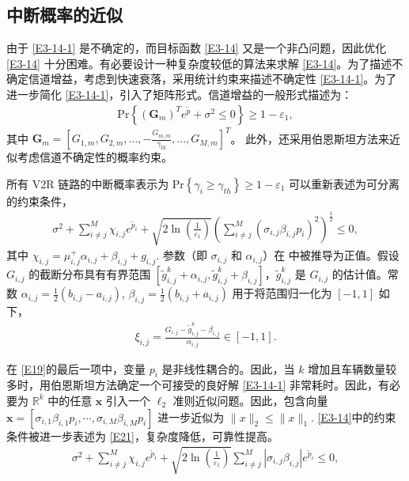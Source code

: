 \subsection{中断概率的近似}\label{section3-3-2}

由于 \eqref{E3-14-1} 是不确定的，而目标函数 \eqref{E3-14} 又是一个非凸问题，因此优化 \eqref{E3-14} 十分困难。有必要设计一种复杂度较低的算法来求解 \eqref{E3-14}。为了描述不确定信道增益，考虑到快速衰落，采用统计约束来描述不确定性 \eqref{E3-14-1}。为了进一步简化 \eqref{E3-14-1}，引入了矩阵形式。信道增益的一般形式描述为：
\begin{eqnarray}\label{E18}
\textrm{Pr}\left\{\left(\textbf{G}_m\right)^Te^{\widetilde{p}}+\sigma^2\le0\right\}\geq1-\varepsilon_1,
\end{eqnarray}
其中 $\textbf{G}_m=\left[G_{1,m},G_{2,m},\ldots,-\frac{G_{m,m}}{\gamma_{th}},\ldots,G_{M,m}\right]^T$。
此外，还采用伯恩斯坦方法来近似考虑信道不确定性的概率约束。

所有 V2R 链路的中断概率表示为 $\textrm{Pr}\left\{\gamma_i\geq\gamma_{th}\right\}\geq1-\varepsilon_1$
可以重新表述为可分离的约束条件，
\begin{eqnarray}\label{E19}
\!\!\!\sigma^2+\!\sum_{i\neq j}^{M}{\chi_{i,j}e^{{\widetilde{p}}_i}}+\sqrt{2\ln\left(\frac{1}{\varepsilon_1}\right)}\left(\sum_{i\neq j}^{M}\left(\sigma_{i,j}\beta_{i,j}p_i\right)^2\right)^\frac{1}{2}\!\!\!\!\!\le0,
\end{eqnarray}
其中 $\chi_{i,j}=\mu_{i,j}^+\alpha_{i,j}+\beta_{i,j}+g_{i,j}$. 参数（即 $\sigma_{i,j}$ 和 $\alpha_{i,j}$）在 \cite{CCO}中被推导为正值。假设 $G_{i,j}$ 的截断分布具有有界范围 $\left[{\widetilde{g}}_{i,j}^k+\alpha_{i,j},{\widetilde{g}}_{i,j}^k+\beta_{i,j}\right]$，${\widetilde{g}}_{i,j}^k$ 是 $G_{i,j}$ 的估计值。常数 $\alpha_{i,j}=\frac{1}{2}\left(b_{i,j}-a_{i,j}\right)$, $\beta_{i,j}=\frac{1}{2}\left(b_{i,j}+a_{i,j}\right)$ 用于将范围归一化为 $\left[-1,1\right]$ 如下，
\begin{eqnarray}\label{E20}
\xi_{i,j}=\frac{G_{i,j}-{\widetilde{g}}_{i,j}^k-\beta_{i,j}}{\alpha_{i,j}}\in\left[-1,1\right].
\end{eqnarray}

在 \eqref{E19}的最后一项中，变量 $p_i$ 是非线性耦合的。因此，当 $k$ 增加且车辆数量较多时，用伯恩斯坦方法确定一个可接受的良好解 \eqref{E3-14-1} 非常耗时。因此，有必要为 $\mathbb{R}^k$ 中的任意 $\mathbf{x}$ 引入一个 $\ell_2$ 准则近似问题。因此，包含向量 $\mathbf{x}=\left[\sigma_{i,1}\beta_{i,1}p_i,\cdots,\sigma_{i,M}\beta_{i,M}p_i\right]$ 进一步近似为 $\parallel x\parallel_2 \le \parallel x\parallel_1$. \eqref{E3-14}中的约束条件被进一步表述为 \eqref{E21}，复杂度降低，可靠性提高。
\begin{eqnarray}\label{E21}
\sigma^2+\sum_{i\neq j}^{M}{\chi_{i,j}e^{{\widetilde{p}}_i}}+\sqrt{2\ln\left(\frac{1}{\varepsilon_1}\right)}\sum_{i\neq j}^{M}{\left|\sigma_{i,j}\beta_{i,j}\right|e^{{\widetilde{p}}_i}}\le0,
\end{eqnarray}

